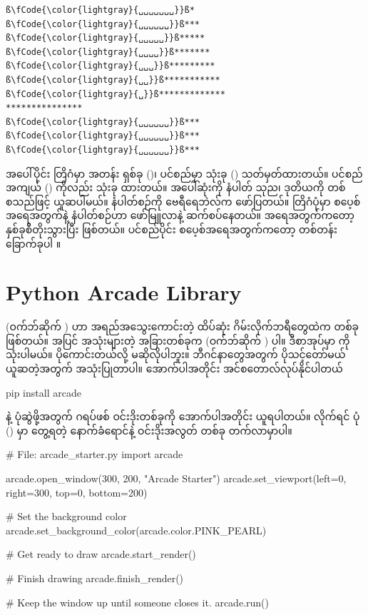 %
\begin{verbatim}
ß\fCode{\color{lightgray}{␣␣␣␣␣␣␣}}ß*
ß\fCode{\color{lightgray}{␣␣␣␣␣␣}}ß***
ß\fCode{\color{lightgray}{␣␣␣␣␣}}ß*****
ß\fCode{\color{lightgray}{␣␣␣␣}}ß*******
ß\fCode{\color{lightgray}{␣␣␣}}ß*********
ß\fCode{\color{lightgray}{␣␣}}ß***********
ß\fCode{\color{lightgray}{␣}}ß*************
***************
ß\fCode{\color{lightgray}{␣␣␣␣␣␣}}ß***
ß\fCode{\color{lightgray}{␣␣␣␣␣␣}}ß***
ß\fCode{\color{lightgray}{␣␣␣␣␣␣}}ß***
\end{verbatim}
%

အပေါ်ပိုင်း တြိဂံမှာ အတန်း ရှစ်ခု ()၊ ပင်စည်မှာ သုံးခု () သတ်မှတ်ထားတယ်။ ပင်စည် အကျယ် () ကိုလည်း \fCode{*} သုံးခု ထားတယ်။ အပေါ်ဆုံးကို  နံပါတ် သုည၊ ဒုတိယကို တစ် စသည်ဖြင့် ယူဆပါမယ်။  နံပါတ်စဉ်ကို  ဗေရီရေဘဲလ်က ဖော်ပြတယ်။ တြိဂံပုံမှာ  စပေ့စ်အရေအတွက်နဲ့   နံပါတ်စဉ်ဟာ  ဖော်မြူလာနဲ့ ဆက်စပ်နေတယ်။ \fCode{*} အရေအတွက်ကတော့ နှစ်ခုစီတိုးသွားပြီး  ဖြစ်တယ်။ ပင်စည်ပိုင်း စပေ့စ်အရေအတွက်ကတော့ တစ်တန်း ခြောက်ခုပါ  ။


\section{Python Arcade Library} \label{sec:python_arcade}
 (ဝက်ဘ်ဆိုက် ) ဟာ အရည်အသွေးကောင်းတဲ့ ထိပ်ဆုံး  ဂိမ်းလိုက်ဘရီတွေထဲက တစ်ခုဖြစ်တယ်။  အပြင် အသုံးများတဲ့ အခြားတစ်ခုက  (ဝက်ဘ်ဆိုက် ) ပါ။ ဒီစာအုပ်မှာ  ကို သုံးပါမယ်။  ပိုကောင်းတယ်လို့ မဆိုလိုပါဘူး။ ဘီဂင်နာတွေအတွက် ပိုသင့်တော်မယ် ယူဆတဲ့အတွက် အသုံးပြုတာပါ။ အောက်ပါအတိုင်း အင်စတောလ်လုပ်နိုင်ပါတယ်
\begin{codetxt}
pip install arcade
\end{codetxt}

  နဲ့ ပုံဆွဲဖို့အတွက် ဂရပ်ဖစ် ဝင်းဒိုးတစ်ခုကို အောက်ပါအတိုင်း ယူရပါတယ်။  လိုက်ရင် ပုံ (\fRefNo{\ref{fig:ch07starter}}) မှာ တွေ့ရတဲ့ နောက်ခံရောင်နဲ့ ဝင်းဒိုးအလွတ် တစ်ခု တက်လာမှာပါ။
%
\begin{py}
# File: arcade_starter.py
import arcade

arcade.open_window(300, 200, "Arcade Starter")
arcade.set_viewport(left=0, right=300, top=0, bottom=200)

# Set the background color
arcade.set_background_color(arcade.color.PINK_PEARL)

# Get ready to draw
arcade.start_render()

# Finish drawing
arcade.finish_render()

# Keep the window up until someone closes it.
arcade.run()
\end{py}
%

